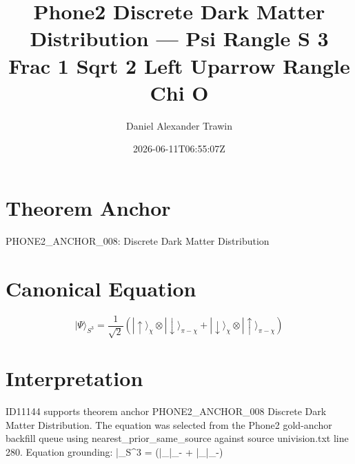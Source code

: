 \documentclass[11pt]{article}
\title{Phone2 Discrete Dark Matter Distribution — Psi Rangle S 3 Frac 1 Sqrt 2 Left Uparrow Rangle Chi O}
\author{Daniel Alexander Trawin}
\date{2026-06-11T06:55:07Z}
\begin{document}
\maketitle
\section*{Theorem Anchor}
PHONE2_ANCHOR_008: Discrete Dark Matter Distribution
\section*{Canonical Equation}
\[
|\Psi\rangle_{S^3} = \frac{1}{\sqrt{2}}\left(|\uparrow\rangle_\chi \otimes |\downarrow\rangle_{\pi-\chi} + |\downarrow\rangle_\chi \otimes |\uparrow\rangle_{\pi-\chi}\right)
\]
\section*{Interpretation}
ID11144 supports theorem anchor PHONE2_ANCHOR_008 Discrete Dark Matter Distribution. The equation was selected from the Phone2 gold-anchor backfill queue using nearest_prior_same_source against source univision.txt line 280. Equation grounding: |\Psi\rangle_{S^3} = \left(|\uparrow\rangle_\chi \otimes |\downarrow\rangle_{\pi-\chi} + |\downarrow\rangle_\chi \otimes |\uparrow\rangle_{\pi-\chi}\right)
\end{document}
